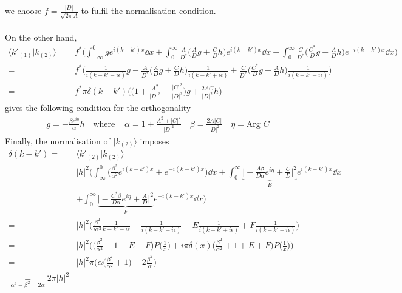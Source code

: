 we choose $f = \frac{|D|}{\sqrt{2\pi} A}$ to fulfil the normalisation condition. \\\\
On the other hand, 
\begin{equation}
\begin{split}
\langle k'_{(1)} | k_{(2)} \rangle = &
f^*\bigg( \int_{-\infty}^0 g e^{i(k-k')x} \dd x + \int_0^{\infty} \frac{A}{D^*}\big(\frac{A}{D}g + \frac{C}{D}h \big) e^{i(k-k')x} \dd x + \int^{\infty}_0 \frac{C}{D^*} \big( \frac{C^*}{D}g + \frac{A}{D}h \big) e^{-i(k - k')x} \dd x \bigg)   \\
= & f^*\Big( \frac{1}{i(k-k' - i\epsilon)} g - \frac{A}{D^*}\big(\frac{A}{D} g + \frac{C}{D} h \big) \frac{1}{i(k-k' + i\epsilon)} + \frac{C}{D^*}\big( \frac{C^*}{D}g + \frac{A}{D}h \big) \frac{1}{i(k-k' -i\epsilon)} \Big)    \\
= & f^* \pi \delta(k-k') \Big(  \big(1+ \frac{A^2}{|D|^2} + \frac{|C|^2}{|D|^2} \big) g + \frac{2AC}{|D|^2}h  \Big)
\end{split}
\end{equation}
gives the following condition for the orthogonality
\begin{equation}
\begin{split}
g = - \frac{\beta e^{i\eta}}{\alpha} h \quad \textrm{where }
& \alpha = 1 + \frac{A^2 + |C|^2}{|D|^2}  \quad
 \beta = \frac{2A|C|}{|D|^2}  \quad
\eta = \textrm{Arg } C
\end{split}
\end{equation}
Finally, the normalisation of $| k_{(2)} \rangle$ imposes 
\begin{equation}
\begin{split}
\delta(k - k') = & \langle k'_{(2)} | k_{(2)} \rangle \\
= & |h|^2 \bigg( \int_{\infty}^0 \Big( \frac{\beta^2}{\alpha^2} e^{i(k-k')x} + e^{-i(k-k')x} \Big) \dd x 
+ \int_0^{\infty} \underbrace{\Big|-\frac{A\beta}{D\alpha} e^{i\eta} + \frac{C}{D}\Big|^2}_{\text{$E$}} e^{i(k-k')x} \dd x \\
& + \int_0^{\infty}\underbrace{\Big|-\frac{C^*\beta}{D\alpha} e^{i\eta} + \frac{A}{D}\Big|^2}_{\text{$F$}} e^{-i(k-k')x}\dd x \bigg) \\
= & |h|^2 \bigg(\frac{\beta^2}{i \alpha^2}\frac{1}{k-k'-i\epsilon} - \frac{1}{i(k-k'+i\epsilon)} - E\frac{1}{i(k-k'+i\epsilon)} + F \frac{1}{i(k-k'-i\epsilon)} \bigg)   \\
= & |h|^2 \bigg( \Big(\frac{\beta^2}{\alpha^2} - 1 - E + F \Big) P\big(\frac{1}{x}\big) + i\pi \delta(x)\Big(\frac{\beta^2}{\alpha^2} + 1 + E + F \Big) P\big(\frac{1}{x}\big) \bigg)  \\
= & |h|^2\pi \bigg( \alpha\Big(\frac{\beta^2}{\alpha^2} + 1 \Big) - 2\frac{\beta^2}{\alpha}  \bigg) \\
\underset{\alpha^2 - \beta^2 = 2\alpha}{=}  2\pi|h|^2
\end{split}
\end{equation}
